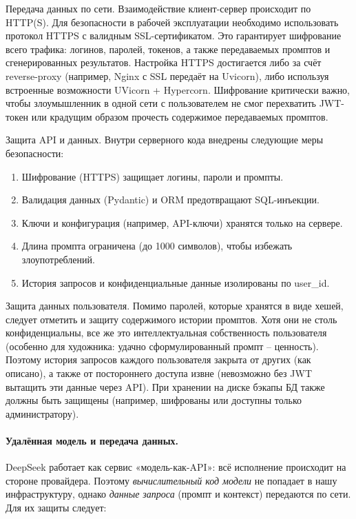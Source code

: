 Передача данных по сети. Взаимодействие клиент-сервер происходит по HTTP(S). Для безопасности в рабочей эксплуатации необходимо использовать протокол HTTPS с валидным SSL-сертификатом. Это гарантирует шифрование всего трафика: логинов, паролей, токенов, а также передаваемых промптов и сгенерированных результатов. Настройка HTTPS достигается либо за счёт reverse-proxy (например, Nginx с SSL передаёт на Uvicorn), либо используя встроенные возможности UVicorn + Hypercorn. Шифрование критически важно, чтобы злоумышленник в одной сети с пользователем не смог перехватить JWT-токен или крадущим образом прочесть содержимое передаваемых промптов.

Защита API и данных. Внутри серверного кода внедрены следующие меры безопасности:
\begin{enumerate}[label=\arabic*]
    \item Шифрование (HTTPS) защищает логины, пароли и промпты.
    \item Валидация данных (Pydantic) и ORM предотвращают SQL-инъекции.
    \item Ключи и конфигурация (например, API-ключи) хранятся только на сервере.
    \item Длина промпта ограничена (до 1000 символов), чтобы избежать злоупотреблений.
    \item История запросов и конфиденциальные данные изолированы по user\_id.
\end{enumerate}

Защита данных пользователя. Помимо паролей, которые хранятся в виде хешей, следует отметить и защиту содержимого истории промптов. Хотя они не столь конфиденциальны, все же это интеллектуальная собственность пользователя (особенно для художника: удачно сформулированный промпт – ценность). Поэтому история запросов каждого пользователя закрыта от других (как описано), а также от постороннего доступа извне (невозможно без JWT вытащить эти данные через API). При хранении на диске бэкапы БД также должны быть защищены (например, шифрованы или доступны только администратору).

\paragraph{Удалённая модель и передача данных.}
DeepSeek работает как сервис «модель-как-API»: всё исполнение происходит на стороне провайдера.
Поэтому \emph{вычислительный код модели} не попадает в нашу инфраструктуру, однако
\emph{данные запроса} (промпт и контекст) передаются по сети.  
Для их защиты следует:

